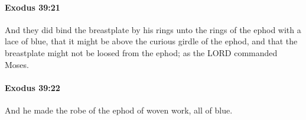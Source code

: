 		\paragraph{Exodus 39:21} %
			\label{EXODUS-39-21}

			And they did bind the breastplate by his rings unto the rings of the ephod with a lace of blue, that it might be above the curious girdle of the ephod, and that the breastplate might not be loosed from the ephod; as the LORD commanded Moses.


		\paragraph{Exodus 39:22} %
			\label{EXODUS-39-22}

			And he made the robe of the ephod of woven work, all of blue.


